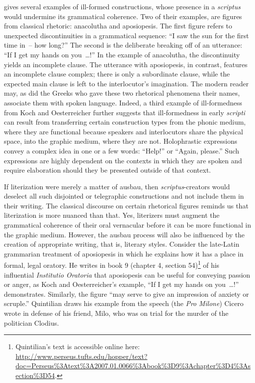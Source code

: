 \citet[590--591]{KochOesterreicher1994} gives several examples of ill-formed constructions, whose presence in a \textit{scriptus} would undermine its grammatical coherence. Two of their examples, are figures from classical rhetoric: anacolutha and aposiopesis. The first figure refers to unexpected discontinuities in a grammatical sequence: “I saw the sun for the first time in~-- how long?” The second is the deliberate breaking off of an utterance: “If I get my hands on you~…!” In the example of anacolutha, the discontinuity yields an incomplete clause. The utterance with aposiopesis, in contrast, features an incomplete clause complex; there is only a subordinate clause, while the expected main clause is left to the interlocutor’s imagination. The modern reader may, as did the Greeks who gave these two rhetorical phenomena their names, associate them with spoken language. Indeed, a third example of ill-formedness from Koch and Oesterreicher further suggests that ill-formedness in early \textit{scripti} can result from transferring certain construction types from the phonic medium, where they are functional because speakers and interlocutors share the physical space, into the graphic medium, where they are not. Holophrastic expressions convey a complex idea in one or a few words: “Help!” or “Again, please.” Such expressions are highly dependent on the contexts in which they are spoken and require elaboration should they be presented outside of that context.

If literization were merely a matter of ausbau, then \textit{scriptus}{}-creators would deselect all such disjointed or telegraphic constructions and not include them in their writing. The classical discourse on certain rhetorical figures reminds us that literization is more nuanced than that. Yes, literizers must augment the grammatical coherence of their oral vernacular before it can be more functional in the graphic medium. However, the ausbau process will also be influenced by the creation of appropriate writing, that is, literary styles. Consider the late-Latin grammarian  treatment of aposiopesis in which he explains how it has a place in formal, legal oratory. He writes in book 9 (chapter 4, section 54)\footnote{{Quintilian’s text is accessible online here:} \url{http://www.perseus.tufts.edu/hopper/text?doc=Perseus\%3Atext\%3A2007.01.0066\%3Abook\%3D9\%3Achapter\%3D4\%3Asection\%3D54}. } of his influential \textit{Institutio Oratoria} that aposiopesis can be useful for conveying passion or anger, as Koch and Oesterreicher’s example, “If I get my hands on you~…!” demonstrates. Similarly, the figure “may serve to give an impression of anxiety or scruple.” Quintilian draws his example from the speech (the \textit{Pro Milone}) Cicero wrote in defense of his friend, Milo, who was on trial for the murder of the politician Clodius.\largerpage[-2]

